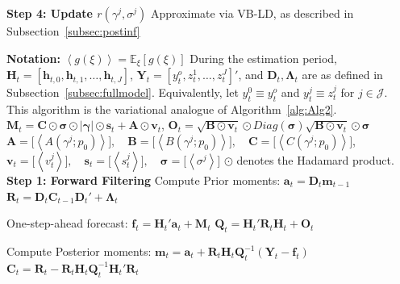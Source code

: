 \documentclass[APA,STIX1COL]{WileyNJD-v2}
\begin{document}
\begin{algorithm}
\begin{algorithmic}
        \State \textbf{Step 4: Update $r(\gamma^j, \sigma^j )$}
        \State Approximate via VB-LD, as described in Subsection~\ref{subsec:postinf}
    \EndFor
\EndWhile

\end{algorithmic}
\end{algorithm}

\begin{algorithm}
\caption{VB-Filtering and VB-Smoothing}
\label{alg:Alg4}
\begin{algorithmic}

\State \textbf{Notation:}
\State $\left\langle g(\xi) \right\rangle = \mathbb{E}_\xi\left[ g(\xi) \right]$
\State  During the estimation period, \(\mathbf{H}_t = [\mathbf{h}_{t,0}, \mathbf{h}_{t,1}, \ldots, \mathbf{h}_{t,J}]\), \(\mathbf{Y}_t = [y_t^o, z_t^1, \ldots, z_t^J]'\), and \(\mathbf{D}_t, \boldsymbol{\Lambda}_t\) are as defined in Subsection~\ref{subsec:fullmodel}.
\State  Equivalently, let \(y_t^0 \equiv y_t^o\) and \(y_t^j \equiv z_t^j\) for \(j\in\mathcal{J}\). This algorithm is the variational analogue of Algorithm~\ref{alg:Alg2}.
\State $\mathbf{M}_t= \mathbf{C} \odot  \mathbf{\sigma} \odot | \mathbf{\gamma} | \odot \mathbf{s}_t + \mathbf{A} \odot \mathbf{v}_t$, \quad $\mathbf{O}_t= \sqrt{\mathbf{B} \odot \mathbf{v}_t} \odot Diag
(\mathbf{\sigma}) \sqrt{\mathbf{B} \odot \mathbf{v}_t} \odot \mathbf{\sigma}$
\State  \(
\mathbf{A} = \big[ \left\langle A(\gamma^j;p_0)  \right\rangle \big], \quad \mathbf{B} = \big[ \left\langle B(\gamma^j;p_0)  \right\rangle \big], \quad \mathbf{C} = \big[ \left\langle C(\gamma^j;p_0)  \right\rangle \big] \), 
\State \( \mathbf{v}_t = \big[ \left\langle v^j_t  \right\rangle \big], \quad  \mathbf{s}_t = \big[ \left\langle
s^j_t  \right\rangle \big] , \quad \mathbf{\sigma} = \big[ \left\langle \sigma^j  \right\rangle \big]
\)
\State \(\odot\) denotes the Hadamard product.
\State \textbf{Step 1: Forward Filtering}
    \State Compute Prior moments:
    \State $\mathbf{a}_t = \mathbf{D}_t \mathbf{m}_{t-1}$
    \State $\mathbf{R}_t = \mathbf{D}_t \mathbf{C}_{t-1} \mathbf{D}_t' +  \boldsymbol{\Lambda}_t$

    \State One-step-ahead forecast:
    \State $\mathbf{f}_t = \mathbf{H}_t'\mathbf{a}_t + \mathbf{M}_t$
    \State $\mathbf{Q}_t = \mathbf{H}_t'\mathbf{R}_t\mathbf{H}_t + \mathbf{O}_t$
    
    \State Compute Posterior moments:
    \State $\mathbf{m}_t = \mathbf{a}_t + \mathbf{R}_t \mathbf{H}_t \mathbf{Q}_t^{-1}(\mathbf{Y}_t - \mathbf{f}_t)$
    \State $\mathbf{C}_t = \mathbf{R}_t - \mathbf{R}_t \mathbf{H}_t \mathbf{Q}_t^{-1} \mathbf{H}_t' \mathbf{R}_t$
\EndFor


\end{algorithmic}
\end{algorithm}
\end{document}
